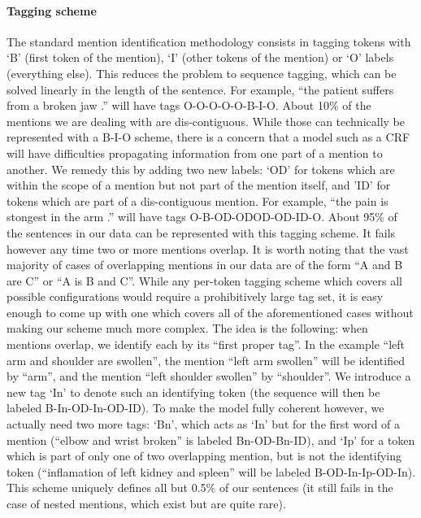 \documentclass[10pt,a4paper]{article}
\begin{document}
\paragraph{Tagging scheme}

The standard mention identification methodology consists in tagging tokens
with ‘B’ (first token of the mention), ‘I’ (other tokens of the mention) or ‘O’
labels (everything else). This reduces the problem to sequence tagging, which
can be solved linearly in the length of the sentence. For example, “the patient
suffers from a broken jaw .” will have tags O-O-O-O-O-B-I-O.
About 10\% of the mentions we are dealing with are dis-contiguous. While
those can technically be represented with a B-I-O scheme, there is a concern
that a model such as a CRF will have difficulties propagating information from
one part of a mention to another. We remedy this by adding two new labels:
‘OD’ for tokens which are within the scope of a mention but not part of the
mention itself, and ’ID’ for tokens which are part of a dis-contiguous mention.
For example, “the pain is stongest in the arm .” will have tags O-B-OD-ODOD-OD-ID-O.
About 95\% of the sentences in our data can be represented with this tagging
scheme. It fails however any time two or more mentions overlap.
It is worth noting that the vast majority of cases of overlapping mentions
in our data are of the form “A and B are C” or “A is B and C”. While any
per-token tagging scheme which covers all possible configurations would require
a prohibitively large tag set, it is easy enough to come up with one which covers
all of the aforementioned cases without making our scheme much more complex.
The idea is the following: when mentions overlap, we identify each by its
“first proper tag”. In the example “left arm and shoulder are swollen”, the
mention “left arm swollen” will be identified by “arm”, and the mention “left
shoulder swollen” by “shoulder”. We introduce a new tag ‘In’ to denote such
an identifying token (the sequence will then be labeled B-In-OD-In-OD-ID).
To make the model fully coherent however, we actually need two more tags:
‘Bn’, which acts as ‘In’ but for the first word of a mention (“elbow and wrist
broken” is labeled Bn-OD-Bn-ID), and ‘Ip’ for a token which is part of only one
of two overlapping mention, but is not the identifying token (“inflamation of
left kidney and spleen” will be labeled B-OD-In-Ip-OD-In).
This scheme uniquely defines all but 0.5\% of our sentences (it still fails in
the case of nested mentions, which exist but are quite rare).
\end{document}

